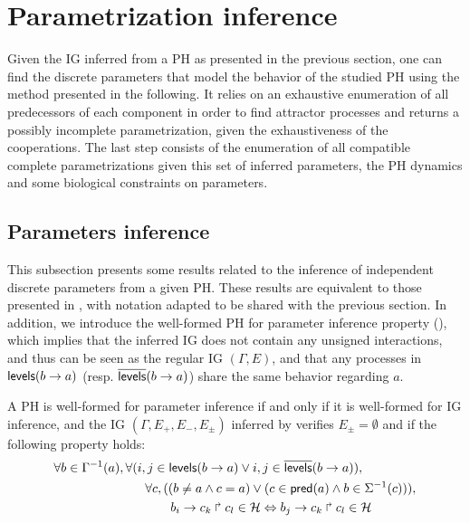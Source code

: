 \section{Parametrization inference}\label{sec:infer-K}

Given the IG inferred from a PH as presented in the previous section, one can find the discrete parameters that model the behavior of the studied PH using the method presented in the following.
It relies on an exhaustive enumeration of all predecessors of each component in order to find attractor processes and returns a possibly incomplete parametrization, given the exhaustiveness of the cooperations.
The last step consists of the enumeration of all compatible complete parametrizations given this
set of inferred parameters, the PH dynamics and some biological constraints on parameters.

\subsection{Parameters inference}


This subsection presents some results related to the inference of independent discrete parameters from a given PH.
These results are equivalent to those presented in \cite{PMR10-TCSB}, with notation adapted to be shared with the previous section.
In addition, we introduce the well-formed PH for parameter inference property (),
which implies that the inferred IG does not contain any unsigned interactions, and thus can be seen as the
regular IG $(\Gamma, E)$,
and that any processes in $\mathsf{levels}(b\rightarrow a)$ (resp. $\overline{\mathsf{levels}}(b\rightarrow a)$) share the same behavior
regarding $a$.


\begin{property}\label{pro:wf-ph-K}
A PH is well-formed for parameter inference if and only if
it is well-formed for IG inference, and
the IG $(\Gamma, E_+, E_-, E_\pm)$ inferred by 
verifies $E_\pm=\emptyset$ and if the following property holds:
\begin{align}
\begin{split}
\forall b\in \Gamma^{-1}(a) &,
	\forall (i,j\in\mathsf{levels}(b\rightarrow a) \vee i,j\in\overline{\mathsf{levels}}(b\rightarrow a)), \\
& \qquad	\forall c, ( (b\neq a\wedge c=a) \vee (c\in\mathsf{pred}(a) \wedge b\in\Sigma^{-1}(c))), \\
& \qquad \qquad
			b_i\rightarrow c_k\Rsh c_l\in\mathcal{H} \Leftrightarrow
				b_j\rightarrow c_k\Rsh c_l\in\mathcal{H}
\end{split}
\label{eq:wf-levels}
\end{align}
\end{property}

